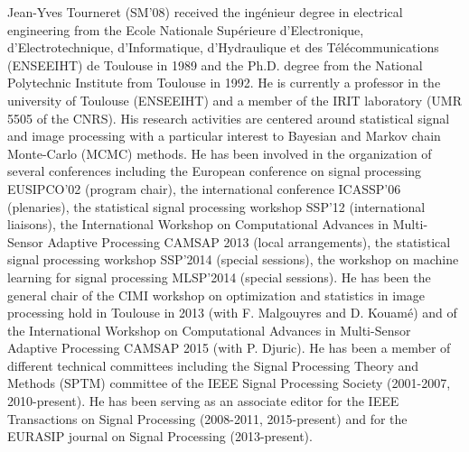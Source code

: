 \documentclass[journal,final,letterpaper,twoside,twocolumn]{IEEEtran}
\begin{document}
\begin{IEEEbiography}{Jean-Yves Tourneret} (SM'08) received the ing{\'e}nieur degree in electrical engineering from the Ecole Nationale Sup{\'e}rieure d'Electronique, d'Electrotechnique, d'Informatique, d'Hydraulique et des T{\'e}l{\'e}communications (ENSEEIHT) de Toulouse in 1989 and the Ph.D. degree from the National Polytechnic Institute from Toulouse in 1992. He is currently a professor in the university of Toulouse (ENSEEIHT) and a member of the IRIT laboratory (UMR 5505 of the CNRS). His research activities are centered around statistical signal and image processing with a particular interest to Bayesian and Markov chain Monte-Carlo (MCMC) methods. He has been involved in the organization of several conferences including the European conference on signal processing EUSIPCO'02 (program chair), the international conference ICASSP'06 (plenaries), the statistical signal processing workshop SSP'12 (international liaisons), the International Workshop on Computational Advances in Multi-Sensor Adaptive Processing CAMSAP 2013 (local arrangements), the statistical signal processing workshop SSP'2014 (special sessions), the workshop on machine learning for signal processing MLSP'2014 (special sessions). He has been the general chair of the CIMI workshop on optimization and statistics in image processing hold in Toulouse in 2013 (with F. Malgouyres and D. Kouam{\'e}) and of the International Workshop on Computational Advances in Multi-Sensor Adaptive Processing CAMSAP 2015 (with P. Djuric). He has been a member of different technical committees including the Signal Processing Theory and Methods (SPTM) committee of the IEEE Signal Processing Society (2001-2007, 2010-present). He has been serving as an associate editor for the IEEE Transactions on Signal Processing (2008-2011, 2015-present) and for the EURASIP journal on Signal Processing (2013-present).
\end{IEEEbiography}
\end{document}
